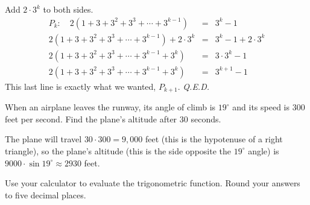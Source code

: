 \documentclass[12pt,addpoints, answers, fleqn]{exam}
\begin{document}
\begin{questions}
\begin{solution}
Add $2 \cdot 3^k$ to both sides.
\begin{eqnarray*}
P_k: \quad 2\left(1 + 3 + 3^2 + 3^3 + \cdots +  3^{k - 1} \right) &=& 3^k - 1\\
2\left(1 + 3 + 3^2 + 3^3 + \cdots +  3^{k - 1} \right) + 2 \cdot 3^k &=& 3^k - 1 + 2 \cdot 3^k\\
2\left(1 + 3 + 3^2 + 3^3 + \cdots +  3^{k - 1} + 3^k \right)  &=& 3\cdot 3^k - 1\\
2\left(1 + 3 + 3^2 + 3^3 + \cdots +  3^{k - 1} + 3^k \right)  &=& 3^{k+1} - 1
\end{eqnarray*}
This last line is exactly what we wanted, $P_{k+1}$. \emph{Q.E.D.}
\end{solution}
\question When an airplane leaves the runway, its angle of climb is $19^\circ$ and its speed is $300$ feet per second. Find the plane's altitude after 30 seconds.
\begin{solution} The plane will travel $30 \cdot 300 = 9,000$ feet (this is the hypotenuse of a right triangle), so the plane's altitude (this is the side opposite the  $19^\circ$ angle) is  $9000 \cdot \sin 19^\circ \approx \boxed{2930}$ feet.
\end{solution}
\question Use your calculator to evaluate the trigonometric function. Round your answers to five decimal places.
\end{questions}
\end{document}
